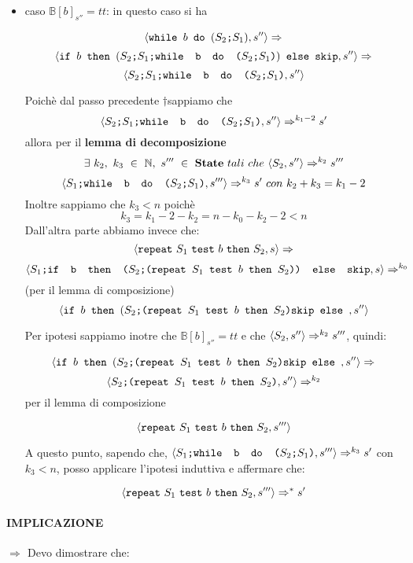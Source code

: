 {\begin{itemize}
		\item caso $\mathbb{B}[b]_{s''}=tt$: in questo caso si ha 

		\[ \confSs{\wbS{b}{(\concat{$S_2$}{$S_1$})}}{s''}\Rar{} \]
		\[ \confSs{\ifABC{b}{(\concat{\concat{$S_2$}{$S_1$}}
		{\wbS{b}{(\concat{$S_2$}{$S_1$})}})}{\skipistr}}{s''}\Rar{} \]
	\[ 	\confSs{\concat{\concat{$S_2$}{$S_1$}}
		{\wbS{b}{(\concat{$S_2$}{$S_1$})}}}{s''} \]

		Poichè dal passo precedente $\dagger $sappiamo che 
		\[ \confSs{\concat{\concat{$S_2$}{$S_1$}}
			{\wbS{b}{(\concat{$S_2$}{$S_1$})}}}{s''}\Rar{k_1 -2}s' \]
		allora
		per il \textbf{lemma di decomposizione} \\ 
	\[ 	\exists{}~k_2,~k_3~\in~
		\mathbb{N},~s'''~\in~\states{}~tali~che~\confSs{S_2}{s''}\Rar{k_2}s'''\]
		\[\confSs{\concat{$S_1$}{\wbS{b}{(\concat{$S_2$}{$S_1$})}}}{s'''}
		\Rar{k_3}s'~con~k_2+k_3=k_1-2 \]
		Inoltre sappiamo che $k_3<n$ poichè 
	\[ 	k_3=k_1-2-k_2=n-k_0-k_2-2<n \]
		Dall'altra parte abbiamo invece che:
		\[ \confSs{\repeatSbS{S_1}{b}{S_2}}{s}\Rar{} \]
	\[ 	\confSs{\concat{$S_1$}{\ifABC{b}{(\concat{$S_2$}
		{(\repeatSbS{$S_1$}{$b$}{$S_2$})})}{\skipistr}}}{s}\Rar{k_0} \] (per il
		lemma di composizione)\\
	\[ 	\confSs{\ifABC{b}{(\concat{$S_2$}
		{(\repeatSbS{$S_1$}{$b$}{$S_2$})}{\skipistr}}}{s''} \]

		Per ipotesi sappiamo inotre che $\mathbb{B}[b]_{s''}=tt$ e che 
		$\confSs{S_2}{s''}\Rar{k_2}s'''$, quindi:
	
\[ 		\confSs{\ifABC{b}{(\concat{$S_2$}
		{(\repeatSbS{$S_1$}{$b$}{$S_2$})}{\skipistr}}}{s''}\Rar{} \]
	\[ 	\confSs{\concat{$S_2$}{(\repeatSbS{$S_1$}{$b$}{$S_2$})}}{s''}\Rar{k_2} \] per il lemma di composizione 

		\[ \confSs{\repeatSbS{S_1}{b}{S_2}}{s'''} \]

		A questo punto, sapendo che,
		$\confSs{\concat{$S_1$}{\wbS{b}{(\concat{$S_2$}{$S_1$})}}}{s'''}
		\Rar{k_3}s'$ con $k_3<n$, posso applicare l'ipotesi induttiva e affermare che:
	
		\[ \confSs{\repeatSbS{S_1}{b}{S_2}}{s'''}\Rar{*}s' \]
		
	\end{itemize}

	\paragraph{IMPLICAZIONE} \textbf{\Large{$\Longrightarrow$ }} 
	Devo dimostrare che:
	\begin{center}
	\exThreeLtR{}
	\end{center}
	
}
